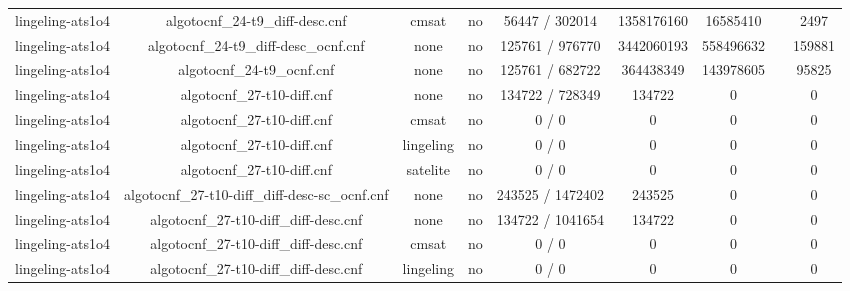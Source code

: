 \begin{appendices}
\begin{table}[p]
\begin{center}
\begin{tabular}{l|cccccccc}
  lingeling-ats1o4               & algotocnf\_24-t9\_diff-desc.cnf & cmsat      & no    & 56447 / 302014 & 1358176160 & 16585410  &            & 2497 \\ %
  lingeling-ats1o4               & algotocnf\_24-t9\_diff-desc\_ocnf.cnf & none       & no    & 125761 / 976770 & 3442060193 & 558496632 &            & 159881 \\ %
  lingeling-ats1o4               & algotocnf\_24-t9\_ocnf.cnf     & none       & no    & 125761 / 682722 & 364438349 & 143978605 &            & 95825 \\ %
  lingeling-ats1o4               & algotocnf\_27-t10-diff.cnf     & none       & no    & 134722 / 728349 & 134722    & 0         &            & 0 \\ %
  lingeling-ats1o4               & algotocnf\_27-t10-diff.cnf     & cmsat      & no    & 0 / 0      & 0         & 0         &            & 0 \\ %
  lingeling-ats1o4               & algotocnf\_27-t10-diff.cnf     & lingeling  & no    & 0 / 0      & 0         & 0         &            & 0 \\ %
  lingeling-ats1o4               & algotocnf\_27-t10-diff.cnf     & satelite   & no    & 0 / 0      & 0         & 0         &            & 0 \\ %
  lingeling-ats1o4               & algotocnf\_27-t10-diff\_diff-desc-sc\_ocnf.cnf & none       & no    & 243525 / 1472402 & 243525    & 0         &            & 0 \\ %
  lingeling-ats1o4               & algotocnf\_27-t10-diff\_diff-desc.cnf & none       & no    & 134722 / 1041654 & 134722    & 0         &            & 0 \\ %
  lingeling-ats1o4               & algotocnf\_27-t10-diff\_diff-desc.cnf & cmsat      & no    & 0 / 0      & 0         & 0         &            & 0 \\ %
  lingeling-ats1o4               & algotocnf\_27-t10-diff\_diff-desc.cnf & lingeling  & no    & 0 / 0      & 0         & 0         &            & 0 \\ %

\end{tabular}
\end{center}
\end{table}
\end{appendices}
